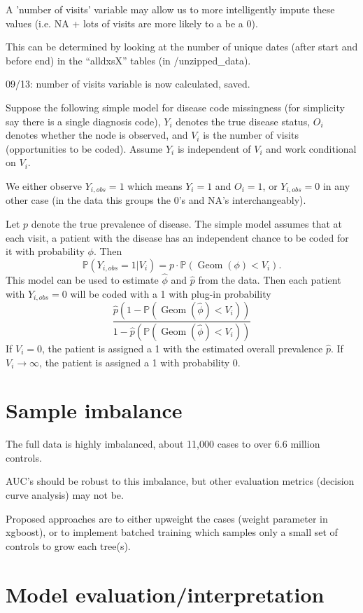 \documentclass[12pt]{article}
\begin{document}
A 'number of visits' variable may allow us to more intelligently impute these values (i.e. NA + lots of visits are more likely to a be a 0).

This can be determined by looking at the number of unique dates (after start and before end) in the ``alldxsX'' tables (in /unzipped\_data).

09/13: number of visits variable is now calculated, saved.

Suppose the following simple model for disease code missingness (for simplicity say there is a single diagnosis code), $Y_i$ denotes the true disease status, $O_i$ denotes whether the node is observed, and $V_i$ is the number of visits (opportunities to be coded). Assume $Y_i$ is independent of $V_i$ and work conditional on $V_i$.

We either observe $Y_{i,obs} = 1$ which means $Y_i=1$ and $O_i=1$, or $Y_{i,obs} = 0$ in any other case (in the data this groups the 0's and NA's interchangeably).

Let $p$ denote the true prevalence of disease. The simple model assumes that at each visit, a patient with the disease has an independent chance to be coded for it with probability $\phi$. Then
\[
\mathbb{P}(Y_{i,obs}=1 | V_i) = p \cdot \mathbb{P}(\operatorname{Geom}(\phi) < V_i).
\]
This model can be used to estimate $\hat{\phi}$ and $\hat{p}$ from the data. Then each patient with $Y_{i,obs}=0$ will be coded with a 1 with plug-in probability
\[
\frac{\hat{p}\left(1 - \mathbb{P}(\operatorname{Geom}(\hat{\phi}) < V_i) \right)}{1-\hat{p} \left(\mathbb{P}(\operatorname{Geom}(\hat{\phi}) < V_i) \right)}
\]
If $V_i=0$, the patient is assigned a 1 with the estimated overall prevalence $\hat{p}$. If $V_i \rightarrow \infty$, the patient is assigned a 1 with probability 0.

\section*{Sample imbalance}

The full data is highly imbalanced, about 11,000 cases to over 6.6 million controls.

AUC's should be robust to this imbalance, but other evaluation metrics (decision curve analysis) may not be.

Proposed approaches are to either upweight the cases (weight parameter in xgboost), or to implement batched training which samples only a small set of controls to grow each tree(s).

\section*{Model evaluation/interpretation}
\end{document}
